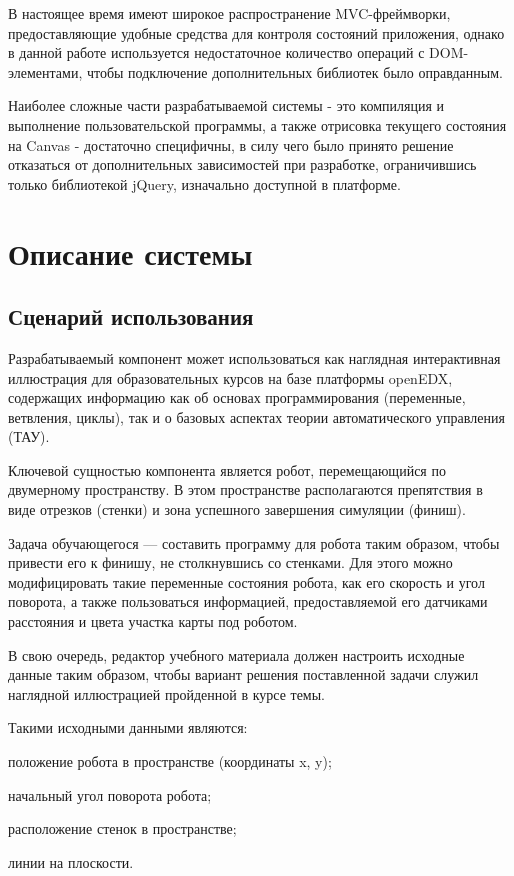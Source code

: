 В настоящее время имеют широкое распространение MVC-фреймворки, предоставляющие удобные средства для контроля состояний приложения, однако в данной работе используется недостаточное количество операций с DOM-элементами, чтобы подключение дополнительных библиотек было оправданным.

Наиболее сложные части разрабатываемой системы - это компиляция и выполнение пользовательской программы, а также отрисовка текущего состояния на Canvas - достаточно специфичны, в силу чего было принято решение отказаться от дополнительных зависимостей при разработке, ограничившись только библиотекой jQuery, изначально доступной в платформе.

\section{Описание системы}
\subsection{Сценарий использования}

Разрабатываемый компонент может использоваться как наглядная интерактивная иллюстрация для образовательных курсов на базе платформы openEDX, содержащих информацию как об основах программирования (переменные, ветвления, циклы), так и о базовых аспектах теории автоматического управления (ТАУ).

Ключевой сущностью компонента является робот, перемещающийся по двумерному пространству. В этом пространстве располагаются препятствия в виде отрезков (стенки) и зона успешного завершения симуляции (финиш).

Задача обучающегося — составить программу для робота таким образом, чтобы привести его к финишу, не столкнувшись со стенками. Для этого можно модифицировать такие переменные состояния робота, как его скорость и угол поворота, а также пользоваться информацией, предоставляемой его датчиками расстояния и цвета участка карты под роботом.

В свою очередь, редактор учебного материала должен настроить исходные данные таким образом, чтобы вариант решения поставленной задачи служил наглядной иллюстрацией пройденной в курсе темы.

Такими исходными данными являются:

\begin{itemize*}
	\item положение робота в пространстве (координаты x, y);
	\item начальный угол поворота робота;
	\item расположение стенок в пространстве;
	\item линии на плоскости.
\end{itemize*}

